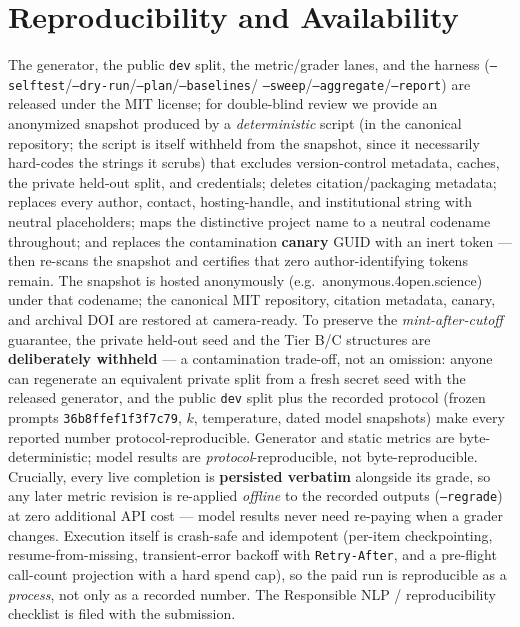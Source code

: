 \documentclass[11pt]{article}
\begin{document}
\section{Reproducibility and Availability}
The generator, the public \texttt{dev} split, the metric/grader lanes, and the harness
(\texttt{--selftest}/\texttt{--dry-run}/\texttt{--plan}/\texttt{--baselines}/%
\texttt{--sweep}/\texttt{--aggregate}/\texttt{--report}) are released under the MIT
license; for double-blind review we provide an anonymized snapshot produced by a
\emph{deterministic} script (in the canonical repository; the script is itself withheld
from the snapshot, since it necessarily hard-codes the strings it scrubs) that
excludes version-control metadata, caches, the private held-out split, and credentials;
deletes citation/packaging metadata; replaces every author, contact, hosting-handle, and
institutional string with neutral placeholders; maps the distinctive project name to a
neutral codename throughout; and replaces the contamination \textbf{canary} GUID with an
inert token --- then re-scans the snapshot and certifies that zero author-identifying
tokens remain. The snapshot is hosted anonymously (e.g.\ anonymous.4open.science) under
that codename; the canonical MIT repository, citation metadata, canary, and archival DOI
are restored at camera-ready. To preserve the \emph{mint-after-cutoff} guarantee, the private held-out seed and
the Tier B/C structures are \textbf{deliberately withheld} --- a contamination trade-off,
not an omission: anyone can regenerate an equivalent private split from a fresh secret
seed with the released generator, and the public \texttt{dev} split plus the recorded
protocol (frozen prompts \texttt{36b8ffef1f3f7c79}, $k$, temperature, dated model snapshots)
make every reported number protocol-reproducible. Generator and static metrics are
byte-deterministic; model results are \emph{protocol}-reproducible, not byte-reproducible.
Crucially, every live completion is \textbf{persisted verbatim} alongside its grade, so any
later metric revision is re-applied \emph{offline} to the recorded outputs
(\texttt{--regrade}) at zero additional API cost --- model results never need re-paying when
a grader changes. Execution itself is crash-safe and idempotent (per-item checkpointing,
resume-from-missing, transient-error backoff with \texttt{Retry-After}, and a pre-flight
call-count projection with a hard spend cap), so the paid run is reproducible as a
\emph{process}, not only as a recorded number.
The Responsible NLP / reproducibility checklist is filed with the submission.
\end{document}
